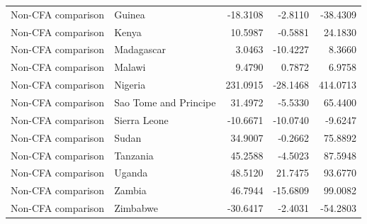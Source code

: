 \begin{table}
\begin{tabular}[t]{llrrr}
Non-CFA comparison & Guinea & -18.3108 & -2.8110 & -38.4309\\
Non-CFA comparison & Kenya & 10.5987 & -0.5881 & 24.1830\\
\addlinespace
Non-CFA comparison & Madagascar & 3.0463 & -10.4227 & 8.3660\\
Non-CFA comparison & Malawi & 9.4790 & 0.7872 & 6.9758\\
Non-CFA comparison & Nigeria & 231.0915 & -28.1468 & 414.0713\\
Non-CFA comparison & Sao Tome and Principe & 31.4972 & -5.5330 & 65.4400\\
Non-CFA comparison & Sierra Leone & -10.6671 & -10.0740 & -9.6247\\
\addlinespace
Non-CFA comparison & Sudan & 34.9007 & -0.2662 & 75.8892\\
Non-CFA comparison & Tanzania & 45.2588 & -4.5023 & 87.5948\\
Non-CFA comparison & Uganda & 48.5120 & 21.7475 & 93.6770\\
Non-CFA comparison & Zambia & 46.7944 & -15.6809 & 99.0082\\
Non-CFA comparison & Zimbabwe & -30.6417 & -2.4031 & -54.2803\\
\bottomrule
\end{tabular}
\end{table}